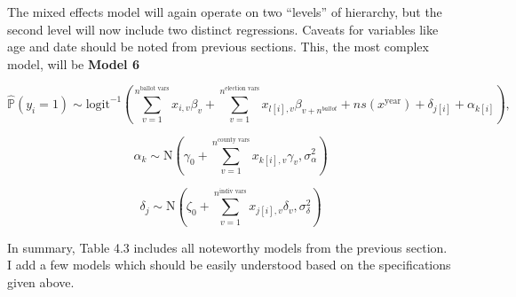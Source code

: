 \documentclass[12pt,twoside]{reedthesis}
\begin{document}
  The mixed effects model will again operate on two ``levels'' of
  hierarchy, but the second level will now include two distinct
  regressions. Caveats for variables like age and date should be noted
  from previous sections. This, the most complex model, will be
  \textbf{Model 6}
  
  \begin{equation} \tag{Model 6}
  \hat{\mathbb{P}}(y_i = 1) \sim \text{logit}^{-1}(\sum_{v = 1}^{n^{\text{ballot vars}}}x_{i,v}\beta_{v} + \sum_{v=1}^{n^{\text{election vars}}}x_{l[i], v}\beta_{v+n^{ballot}} + ns(x^{\text{year}}) +\delta_{j[i]} + \alpha_{k[i]}),
  \end{equation}
  
  \[\alpha_{k} \sim \text{N}(\gamma_0 + \sum_{v=1}^{n^{\text{county vars}}}x_{k[i], v}\gamma_{v}, \sigma_{\alpha}^2)\]
  
  \[\delta_{j} \sim \text{N}(\zeta_0 + \sum_{v=1}^{n^{\text{indiv vars}}}x_{j[i], v}\delta_{v}, \sigma_{\delta}^2)\]
  
  In summary, Table 4.3 includes all noteworthy models from the previous
  section. I add a few models which should be easily understood based on
  the specifications given above.
  
\end{document}
